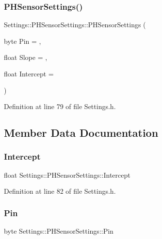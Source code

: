\subsubsection{\texorpdfstring{P\+H\+Sensor\+Settings()}{PHSensorSettings()}\hspace{0.1cm}{\footnotesize\ttfamily [2/2]}}
{\footnotesize\ttfamily Settings\+::\+P\+H\+Sensor\+Settings\+::\+P\+H\+Sensor\+Settings (\begin{DoxyParamCaption}\item[{byte}]{Pin = {},  }\item[{float}]{Slope = {},  }\item[{float}]{Intercept = {} }\end{DoxyParamCaption})\hspace{0.3cm}{\ttfamily [inline]}}



Definition at line 79 of file Settings.\+h.



\subsection{Member Data Documentation}
\mbox{\label{struct_settings_1_1_p_h_sensor_settings_a7978fc33b0646c783bb389664c0b619a}} 
\subsubsection{\texorpdfstring{Intercept}{Intercept}}
{\footnotesize\ttfamily float Settings\+::\+P\+H\+Sensor\+Settings\+::\+Intercept}



Definition at line 82 of file Settings.\+h.

\mbox{\label{struct_settings_1_1_p_h_sensor_settings_ae56a6d50b61e4f561a352be8a215ec1a}} 
\subsubsection{\texorpdfstring{Pin}{Pin}}
{\footnotesize\ttfamily byte Settings\+::\+P\+H\+Sensor\+Settings\+::\+Pin}



